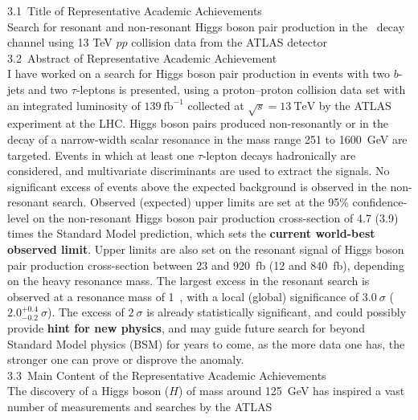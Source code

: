 \documentclass[twoside,11pt]{report}
\begin{document}
\Large{3.1\ Title of Representative Academic Achievements}\\
\newline
\normalsize
Search for resonant and non-resonant Higgs boson pair
production in the \bbtautau\ decay channel using 13 TeV $pp$ collision data from the ATLAS detector\\
\newline
\Large{3.2\ Abstract of Representative Academic Achievement}\\
\normalsize
    \newline
    I have worked on a search for Higgs boson pair production in events with 
    two $b$-jets and two $\tau$-leptons is presented, using a proton--proton collision 
    data set with an integrated luminosity of $139~\text{fb}^{-1}$ collected 
    at $\sqrt{s}=13~\text{TeV}$ by the ATLAS experiment at the LHC. Higgs boson pairs 
    produced non-resonantly or in the decay of a narrow-width scalar resonance in 
    the mass range 251 to 1600~GeV are targeted. Events in which at least one $\tau$-lepton 
    decays hadronically are considered, and multivariate discriminants are used to extract the signals. 
    No significant excess of events above the expected background is observed in the non-resonant search. 
    Observed (expected) upper limits are set at the 95\% confidence-level on the 
    non-resonant Higgs boson pair production cross-section of 4.7 (3.9) times 
    the Standard Model prediction, which sets the \textbf{current world-best 
    observed limit}. 
    Upper limits are also set on the resonant signal of Higgs boson pair production 
    cross-section between 23 and 920~fb (12 and 840~fb), depending on the heavy resonance mass.
    The largest excess in the resonant search is observed at a resonance mass of 
    1~\TeV, with a local (global) significance of $3.0~\sigma$ ($2.0^{+0.4}_{-0.2}~\sigma$). 
    The excess of $2~\sigma$ is already statistically significant, 
    and could possibly provide \textbf{hint for new physics}, and may guide future search for beyond 
    Standard Model physics (BSM) 
    for years to come, as the more data one has, the stronger one can prove or disprove the anomaly.\\
    \newline
\Large{3.3\ Main Content of the Representative Academic Achievements}\\
\normalsize
    \newline
    The discovery of a Higgs boson ($H$) of mass around 125~GeV 
    has inspired a vast number of measurements and searches by the ATLAS 
\end{document}
